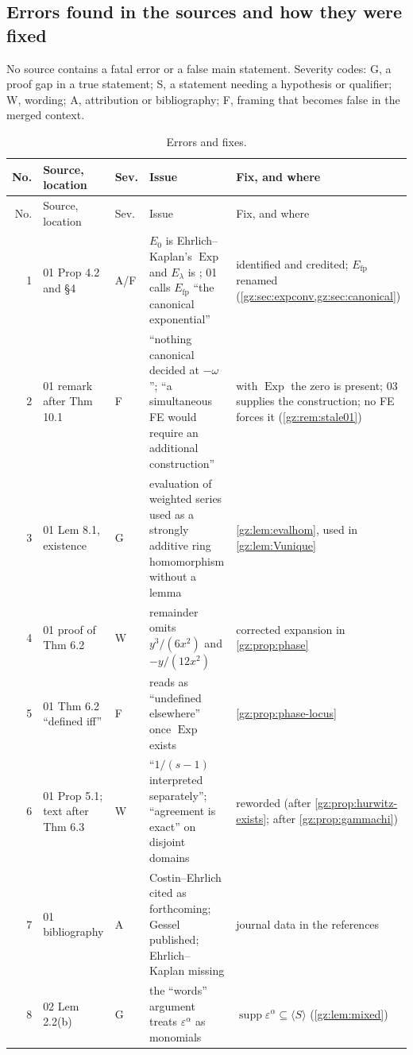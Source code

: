 \documentclass[11pt,a4paper]{article}
\numberwithin{equation}{section}
\theoremstyle{definition}
\theoremstyle{remark}
\newcommand{\eps}{\varepsilon}
\newcommand{\supp}{\operatorname{supp}}
\newcommand{\Exp}{\operatorname{Exp}}
\newcommand{\Efp}{E_{\mathrm{fp}}}
\begin{document}
\subsection{Errors found in the sources and how they were fixed}\label{gz:app:errors}
No source contains a fatal error or a false main statement. Severity codes:
G, a proof gap in a true statement; S, a statement needing a hypothesis or
qualifier; W, wording; A, attribution or bibliography; F, framing that becomes
false in the merged context.
\begin{center}\small
\begin{longtable}{@{}rP{0.16\textwidth}lP{0.30\textwidth}P{0.34\textwidth}@{}}
\caption{Errors and fixes.}\label{gz:tab:errors}\\
\toprule
No. & Source, location & Sev. & Issue & Fix, and where\\
\midrule
\endfirsthead
\toprule
No. & Source, location & Sev. & Issue & Fix, and where\\
\midrule
{} & 01 Prop 4.2 and \S4 & A/F & $E_0$ is Ehrlich--Kaplan's $\Exp$ and $E_\lambda$ is ; 01 calls $\Efp$ ``the canonical exponential'' & identified and credited; $\Efp$ renamed (\cref{gz:sec:expconv,gz:sec:canonical})\\
2 & 01 remark after Thm 10.1 & F & ``nothing canonical decided at $-\omega$''; ``a simultaneous FE would require an additional construction'' & with $\Exp$ the zero is present; 03 supplies the construction; no FE forces it (\cref{gz:rem:stale01})\\
3 & 01 Lem 8.1, existence & G & evaluation of weighted series used as a strongly additive ring homomorphism without a lemma & \cref{gz:lem:evalhom}, used in \cref{gz:lem:Vunique}\\
4 & 01 proof of Thm 6.2 & W & remainder omits $y^3/(6x^2)$ and $-y/(12x^2)$ & corrected expansion in \cref{gz:prop:phase}\\
5 & 01 Thm 6.2 ``defined iff'' & F & reads as ``undefined elsewhere'' once $\Exp$ exists & \cref{gz:prop:phase-locus}\\
6 & 01 Prop 5.1; text after Thm 6.3 & W & ``$1/(s-1)$ interpreted separately''; ``agreement is exact'' on disjoint domains & reworded (after \cref{gz:prop:hurwitz-exists}; after \cref{gz:prop:gammachi})\\
7 & 01 bibliography & A & Costin--Ehrlich cited as forthcoming; Gessel published; Ehrlich--Kaplan missing & journal data in the references\\
8 & 02 Lem 2.2(b) & G & the ``words'' argument treats $\eps^\alpha$ as monomials & $\supp\eps^\alpha\subseteq\langle S\rangle$ (\cref{gz:lem:mixed})\\

\end{longtable}
\end{center}
\end{document}
